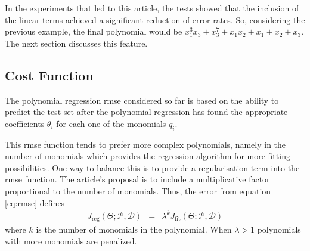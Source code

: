 \documentclass[preprint,authoryear,12pt]{elsarticle}
\begin{document}
In the experiments that led to this article, the tests showed that the inclusion of the linear terms achieved a significant reduction of error rates. So, considering the previous example, the final polynomial would be $x_1^3 x_3 + x_3^7 + x_1 x_2 + x_1 + x_2 + x_3$. The next section discusses this feature.


\subsection{Cost Function}\label{subs:cost.function}

The polynomial regression \ac{rmse} considered so far is based on the ability to predict the test set after the polynomial regression has found the appropriate coefficients $\theta_i$ for each one of the monomials $q_i$.

This \ac{rmse} function tends to prefer more complex polynomials, namely in the number of monomials which provides the regression algorithm for more fitting possibilities. One way to balance this is to provide a regularisation term into the \ac{rmse} function. The article's proposal is to include a multiplicative factor proportional to the number of monomials. Thus, the error from equation \ref{eq:rmse} defines
\begin{eqnarray}
J_{\textrm{reg}}\left(\Theta;\mathcal{P},\mathcal{D}\right) &=& \lambda^{k} J_{\textrm{fit}}\left(\Theta;\mathcal{P},\mathcal{D}\right)\label{eq:rmse-reg}
\end{eqnarray}
%
where $k$ is the number of monomials in the polynomial. When $\lambda > 1$ polynomials with more monomials are penalized.
\end{document}
